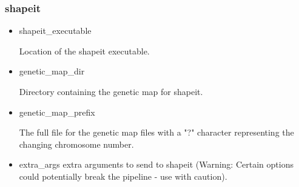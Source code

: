 \documentclass[a4paper,10pt]{article}
\begin{document}
                             \subsubsection{shapeit}
                             \begin{itemize}
                             \item shapeit\_executable

                             Location of the shapeit executable.
                             \item genetic\_map\_dir 

                             Directory containing the genetic map for shapeit.
                             \item genetic\_map\_prefix 

                             The full file for the genetic map files with a "?" character representing the changing chromosome number.
                             \item extra\_args 
                             extra arguments to send to shapeit (Warning: Certain options could
                             potentially break the pipeline  - use with caution).
                             \end{itemize}
\end{document}
